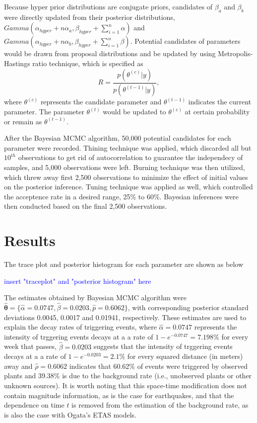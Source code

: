 \documentclass[11pt]{article}\usepackage[]{graphicx}\usepackage[]{color}
\begin{document}
{Because hyper prior distributions are conjugate priors, candidates of $\beta_a$ and $\beta_b$ were directly updated from their posterior distributions, $Gamma(\alpha_{hyper}+n\alpha_a, \beta_{hyper}+\textstyle \sum _{i=1}^n \alpha )$ and $Gamma(\alpha_{hyper}+n\alpha_b, \beta_{hyper}+\textstyle \sum _{i=1}^n \beta )$. Potential candidates of parameters would be drawn from proposal distributions and be updated by using Metropolis-Hastings ratio technique, which is specified as
\begin{equation}
R = \frac{p(\theta^{(c)}|y)}{p(\theta^{(t-1)}|y)},
\end{equation}
where $\theta^{(c)}$ represents the candidate parameter and $\theta^{(t-1)}$ indicates the current parameter. The parameter $\theta^{(t)}$ would be updated to $\theta^{(c)}$ at certain probability or remain as $\theta^{(t-1)}$.

After the Bayesian MCMC algorithm, 50,000 potential candidates for each parameter were recorded. Thining technique was applied, which discarded all but $10^{th}$ observations to get rid of autocorrelation to guarantee the independecy of samples, and 5,000 observations were left. Burning technique was then utilized, which threw away first 2,500 observations to minimize the effect of initial values on the posterior inference.
Tuning technique was applied as well, which controlled the acceptence rate in a desired range, 25\% to 60\%. Bayesian inferences were then conducted based on the final 2,500 observations.  







\section{Results}

The trace plot and posterior histogram for each parameter are shown as below 

\textcolor{blue}{insert "traceplot" and "posterior histogram" here}

The estimates obtained by Bayesian MCMC algorithm were $\boldsymbol{\hat\theta} = \{\hat\alpha = 0.0747, \hat\beta = 0.0203, \hat p = 0.6062\}$, with corresponding posterior standard deviations 0.0045, 0.0017 and 0.01941, respectively. These estimates are used to explain the decay rates of triggering events, where $\hat\alpha = 0.0747$ represents the intensity of trggering events decays at a a rate of $1-e^{-0.0747}=7.198\%$ for every week that passes, $\hat\beta = 0.0203$ suggests that the intensity of trggering events decays at a a rate of $1-e^{-0.0203}=2.1\%$ for every squared distance (in meters) away and $\hat\rho = 0.6062$ indicates that 60.62\% of events were triggered by observed plants and 39.38\% is due to the background rate (i.e., unobserved plants or other unknown sources). It is worth noting that this space-time modification does not contain magnitude information, as is the case for earthquakes, and that the dependence on time $t$ is removed from the estimation of the background rate, as is also the case with Ogata's ETAS models.

}
\end{document}
